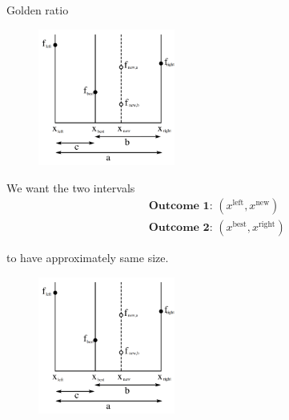 \documentclass[11pt,compress,t,notes=noshow, xcolor=table]{beamer}
\begin{document}
\begin{vbframe}{Golden ratio}
\begin{figure}
\includegraphics[width=0.4\textwidth]{figure_man/goldensec.png}\\
\end{figure}

\framebreak 

We want the two intervals
\begin{eqnarray*}
  && \textbf{Outcome 1: } (x^{\text{left}}, x^{\text{new}})\\
  && \textbf{Outcome 2: } (x^{\text{best}}, x^{\text{right}})
\end{eqnarray*}

to have approximately same size. 

\begin{figure}
\includegraphics[width=0.4\textwidth]{figure_man/goldensec.png}\\
\end{figure}

\end{vbframe}
\end{document}

